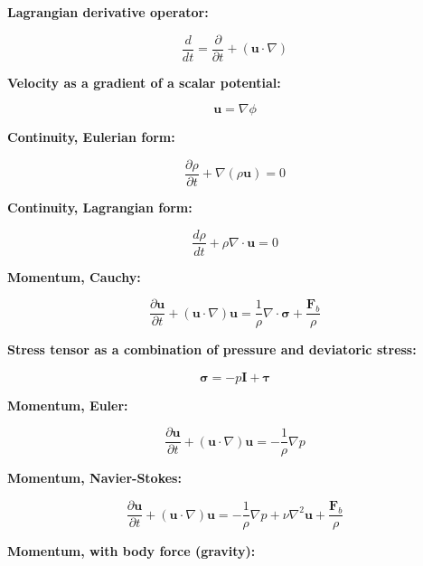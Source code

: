 \documentclass[12pt]{article}
\numberwithin{equation}{section}
\numberwithin{figure}{section}
\numberwithin{table}{section}
\begin{document}
\textbf{Lagrangian derivative operator:}
 
\begin{equation}
  \frac{d}{dt} = \frac{\partial}{\partial t} + (\mathbf{u} \cdot \nabla)
\end{equation}

\textbf{Velocity as a gradient of a scalar potential:}

\begin{equation}
  \mathbf{u} = \nabla \phi
\end{equation}

\textbf{Continuity, Eulerian form:}

\begin{equation}
  \frac{\partial \rho}{\partial t} + \nabla (\rho \mathbf{u}) = 0
\end{equation}

\textbf{Continuity, Lagrangian form:}

\begin{equation}
  \frac{d\rho}{dt} + \rho \nabla \cdot \mathbf{u} = 0
\end{equation}

\textbf{Momentum, Cauchy:}

\begin{equation}
  \frac{\partial \mathbf{u}}{\partial t} + (\mathbf{u} \cdot \nabla) \mathbf{u} =
  \frac{1}{\rho} \nabla \cdot \boldsymbol{\sigma} + \frac{\mathbf{F}_b}{\rho}
\end{equation}

\textbf{Stress tensor as a combination of pressure and deviatoric stress:}

\begin{equation}
  \boldsymbol{\sigma} = -p \mathbf{I} + \boldsymbol{\tau}
\end{equation}

\textbf{Momentum, Euler:}

\begin{equation}
  \frac{\partial \mathbf{u}}{\partial t} + (\mathbf{u} \cdot \nabla) \mathbf{u} =
  - \frac{1}{\rho} \nabla p
\end{equation}

\textbf{Momentum, Navier-Stokes:}

\begin{equation}
  \frac{\partial \mathbf{u}}{\partial t} + (\mathbf{u} \cdot \nabla) \mathbf{u} =
  - \frac{1}{\rho} \nabla p + \nu \nabla^2 \mathbf{u} + \frac{\mathbf{F}_b}{\rho}
\end{equation}

\textbf{Momentum, with body force (gravity):}
\end{document}
